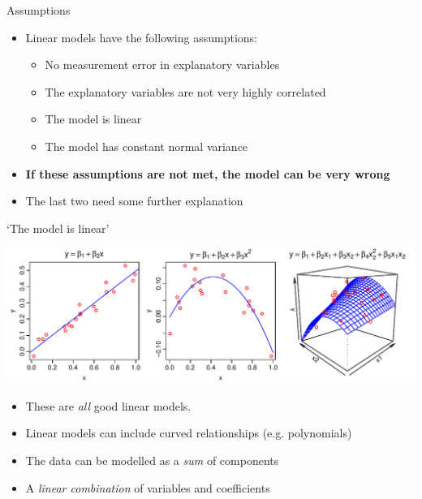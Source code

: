 \documentclass[xcolor=x11names,compress]{beamer}
\renewcommand{\(}{\begin{columns}}
\renewcommand{\)}{\end{columns}}
\newcommand{\<}[1]{\begin{column}{#1}}
\renewcommand{\>}{\end{column}}
\begin{document}
\begin{frame}{Assumptions}

\begin{itemize}\itemsep20pt
\item Linear models have the following assumptions:
\begin{itemize}
\item No measurement error in explanatory variables
\item The explanatory variables are not very highly correlated
\item {} The model is linear
\item {} The model has constant normal variance
\end{itemize}
\item {\bf If these assumptions are not met, the model can be very wrong}
\item<2> The last two need some further explanation
\end{itemize}

\end{frame}


\begin{frame}{`The model is linear'}

\includegraphics[width=\textwidth]{Linear.pdf}

\begin{itemize}
\item These are {\it all} good linear models.
\item Linear models can include curved relationships (e.g. polynomials)
\item The data can be modelled as a {\it sum} of components
\item A {\it linear combination} of variables and coefficients
\end{itemize}

\end{frame}

\end{document}
